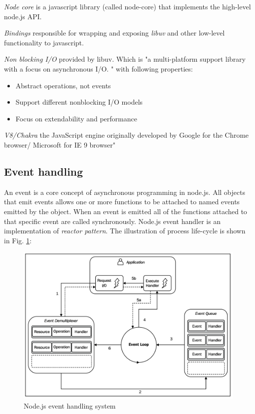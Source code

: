 \textit{Node core} is a javascript library (called node-core) that implements the high-level node.js API.

\textit{Bindings} responsible for wrapping and exposing \textit{libuv} and other low-level functionality to javascript.\cite{nodejsbook}

\textit{Non blocking I/O} provided by libuv\cite{nodejsabout}\cite{nodejsbook}. 
Which is "a multi-platform support library with a focus on asynchronous I/O. "\cite{libuv} with following properties\cite{libuvBasic}:
\begin{itemize}
\item Abstract operations, not events
\item Support different nonblocking I/O models
\item Focus on extendability and performance
\end{itemize}

\textit{V8/Chakra} the JavaScript engine originally developed by Google for the Chrome browser/ Microsoft for IE 9 browser"\cite{nodejsbook} 



\subsection{Event handling}
\label{subsec:event}
An event is a core concept of asynchronous programming in node.js. All objects that emit events allows one or more functions to be attached to named events emitted by the object. When an event is emitted all of the functions attached to that specific event are called synchronously\cite{events}. Node.js  event handler is an implementation of \textit{reactor pattern}. The illustration of process life-cycle is shown in Fig. \ref{fig:nodeEvent}:

\begin{figure}[ht]
  	\label{fig:nodeEvent}
    \centering
    \includegraphics[width=\textwidth]{grafiken/nodeEventHandling.png}
     \caption{Node.js event handling system \cite{nodejsbook}}
  \end{figure}

